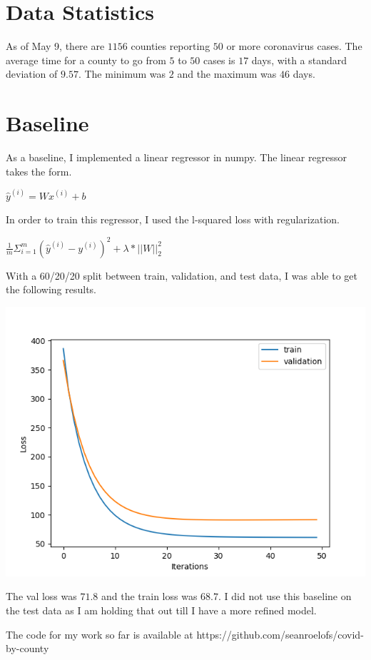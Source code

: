 \documentclass[12pt]{article}
\begin{document}
\section{Data Statistics}
    As of May 9, there are $1156$ counties reporting $50$ or more coronavirus cases. The average time for a county to go from $5$ to $50$ cases is $17$ days, with a standard deviation of $9.57$. The minimum was $2$ and the maximum was $46$ days.


\section{Baseline}
    As a baseline, I implemented a linear regressor in numpy. The linear regressor takes the form.

$\hat y^{(i)} = W x^{(i)} + b$  $\:$

In order to train this regressor, I used the l-squared loss with regularization.

$\frac{1}{m}\Sigma_{i=1}^m (\hat y^{(i)} - y^{(i)})^2 + \lambda * ||W||_2^2$

With a 60/20/20 split between train, validation, and test data, I was able to get the following results.

    \includegraphics[scale = 0.5]{"../output/linear_classifier.png"}

    The val loss was $71.8$ and the train loss was $68.7$. I did not use this baseline on the test data as I am holding that out till I have a more refined model.

    The code for my work so far is available at https://github.com/seanroelofs/covid-by-county
\end{document}
